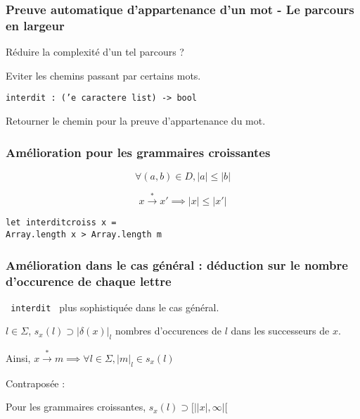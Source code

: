 \documentclass[12pt]{beamer}
\newcommand{\norm}[1]{\lvert #1 \rvert}
\begin{document}
\begin{frame}\frametitle{Preuve automatique d'appartenance d'un mot - Le parcours en largeur}
Réduire la complexité d'un tel parcours ?

Eviter les chemins passant par certains mots.

{\small \color{DarkBlue}\texttt{interdit : ('e caractere list) -> bool\\}}

Retourner le chemin pour la preuve d'appartenance du mot.

\end{frame}

\begin{frame}\frametitle{Amélioration pour les grammaires croissantes}

\begin{equation*}\forall (a,b) \in D, \norm{a} \leq \norm{b} \end{equation*}

\begin{equation*}x \overset{*}{\rightarrow} x' \implies \norm{x} \leq \norm{x'}\end{equation*}

{\small \color{DarkBlue}\texttt{let interditcroiss x = \\ Array.length x > Array.length m}}
\end{frame}

\begin{frame}\frametitle{Amélioration dans le cas général : déduction sur le nombre d’occurence de chaque lettre}
\texttt{ interdit } plus sophistiquée dans le cas général.

$l \in \Sigma$, $s_x(l) \supset \norm{\delta(x)}_l$ nombres d'occurences de $l$ dans les successeurs de $x$. 

Ainsi, $x \overset{*}{\rightarrow} m \implies \forall l \in \Sigma, \norm{m}_l \in s_x(l)$
\pause

Contraposée : 
\fbox{$\exists l \in \Sigma / \norm{m}_l \notin s_x(l) \implies \neg (x \overset{*}{\rightarrow} m)$}
\pause

Pour les grammaires croissantes, $s_x(l) \supset [|\norm{x},\infty|[$
\end{frame}
\end{document}
